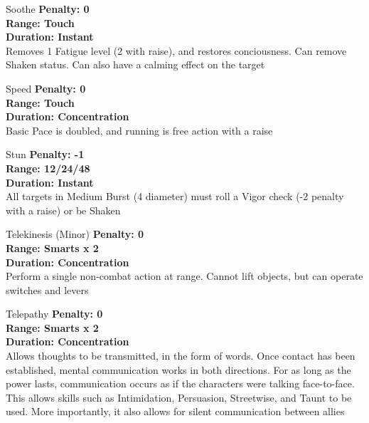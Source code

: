 \begin{multicols}{2}
\begin{genericsection}{Soothe}
\textbf{Penalty: 0}\\
\textbf{Range: Touch}\\
\textbf{Duration: Instant}\\
Removes 1 Fatigue level (2 with raise), and restores conciousness. Can remove Shaken status. Can also have a calming effect on the target
\end{genericsection}

\begin{genericsection}{Speed}
\textbf{Penalty: 0}\\
\textbf{Range: Touch}\\
\textbf{Duration: Concentration}\\
Basic Pace is doubled, and running is free action with a raise
\end{genericsection}

\begin{genericsection}{Stun}
\textbf{Penalty: -1}\\
\textbf{Range: 12/24/48}\\
\textbf{Duration: Instant}\\
All targets in Medium Burst (4 diameter) must roll a Vigor check (-2 penalty with a raise) or be Shaken\\
\end{genericsection}

\begin{genericsection}{Telekinesis (Minor)}
\textbf{Penalty: 0}\\
\textbf{Range: Smarts x 2}\\
\textbf{Duration: Concentration}\\ 
Perform a single non-combat action at range. Cannot lift objects, but can operate switches and levers
\end{genericsection}

\begin{genericsection}{Telepathy}
\textbf{Penalty: 0}\\
\textbf{Range: Smarts x 2}\\
\textbf{Duration: Concentration}\\
Allows thoughts to be transmitted, in the form of words. Once contact has been established, mental communication works in both directions. For as long as the power lasts, communication occurs as if the characters were talking face-to-face. This allows skills such as Intimidation, Persuasion, Streetwise, and Taunt to be used. More importantly, it also allows for silent communication between allies
\end{genericsection}


\end{multicols}
